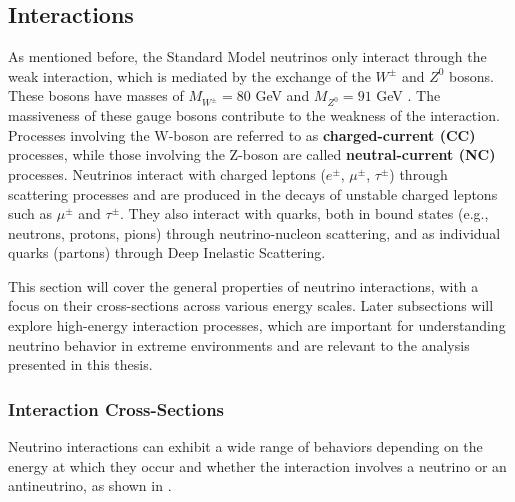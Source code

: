 \subsection{Interactions}
\label{sec:nu_interactions}

As mentioned before, the Standard Model neutrinos only interact through the weak interaction, which is mediated by the exchange of the $W^{\pm}$ and $Z^0$ bosons. These bosons have masses of $M_{W^{\pm}}=80$ GeV  and $M_{Z^0}=91$ GeV . The massiveness of these gauge bosons contribute to the weakness of the interaction. Processes involving the W-boson are referred to as \textbf{charged-current (CC)} processes, while those involving the Z-boson are called \textbf{neutral-current (NC)} processes. Neutrinos interact with charged leptons ($e^{\pm}$, $\mu^{\pm}$, $\tau^{\pm}$) through scattering processes and are produced in the decays of unstable charged leptons such as $\mu^{\pm}$ and $\tau^{\pm}$. They also interact with quarks, both in bound states (e.g., neutrons, protons, pions) through neutrino-nucleon scattering, and as individual quarks (partons) through Deep Inelastic Scattering.

This section will cover the general properties of neutrino interactions, with a focus on their cross-sections across various energy scales. Later subsections will explore high-energy interaction processes, which are important for understanding neutrino behavior in extreme environments and are relevant to the analysis presented in this thesis.

\subsubsection*{Interaction Cross-Sections}
\label{sec:xsec}
Neutrino interactions can exhibit a wide range of behaviors  depending on the energy at which they occur and whether the interaction involves a neutrino or an antineutrino, as shown in . 

